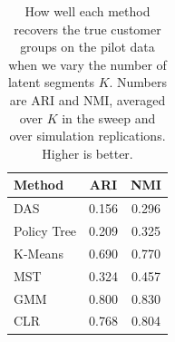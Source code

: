 \begin{table}[htbp]
\centering
\caption{How well each method recovers the true customer groups on the pilot data when we vary the number of latent segments $K$. Numbers are ARI and NMI, averaged over $K$ in the sweep and over simulation replications. Higher is better.}
\label{tab:app-ari-nmi-varying-K-avg}
\begin{tabular}{lcc}
\toprule
Method & ARI & NMI \\
\midrule
DAS & 0.156 & 0.296 \\
Policy Tree & 0.209 & 0.325 \\
K-Means & 0.690 & 0.770 \\
MST & 0.324 & 0.457 \\
GMM & 0.800 & 0.830 \\
CLR & 0.768 & 0.804 \\
\bottomrule
\end{tabular}
\end{table}
